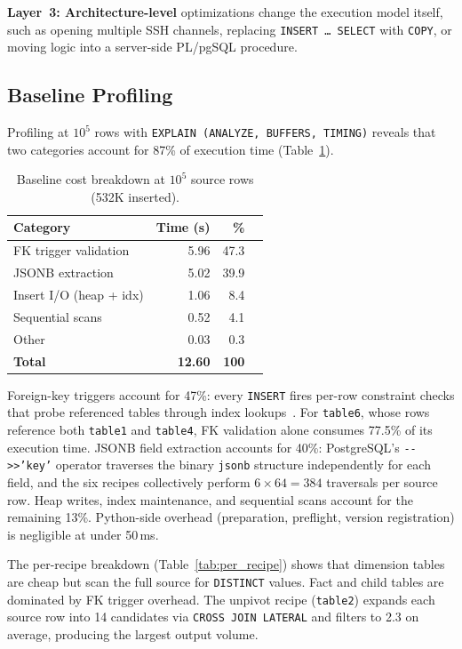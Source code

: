 \documentclass[journal]{IEEEtran}
\begin{document}
\textbf{Layer~3: Architecture-level} optimizations change the execution model itself, such as opening multiple SSH channels, replacing \texttt{INSERT \ldots\ SELECT} with \texttt{COPY}, or moving logic into a server-side PL/pgSQL procedure.

\subsection{Baseline Profiling}
\label{sec:profiling}

Profiling at $10^5$ rows with \texttt{EXPLAIN (ANALYZE, BUFFERS, TIMING)} reveals that two categories account for 87\% of execution time (Table~\ref{tab:baseline_cost}).

\begin{table}[!ht]
\centering
\caption{Baseline cost breakdown at $10^5$ source rows (532K inserted).}
\label{tab:baseline_cost}
\begin{tabular}{lrrr}
\toprule
\textbf{Category} & \textbf{Time (s)} & \textbf{\%} \\
\midrule
FK trigger validation   & 5.96  & 47.3 \\
JSONB extraction        & 5.02  & 39.9 \\
Insert I/O (heap + idx) & 1.06  & 8.4  \\
Sequential scans        & 0.52  & 4.1  \\
Other                   & 0.03  & 0.3  \\
\midrule
\textbf{Total}          & \textbf{12.60} & \textbf{100} \\
\bottomrule
\end{tabular}
\end{table}

Foreign-key triggers account for 47\%: every \texttt{INSERT} fires per-row constraint checks that probe referenced tables through index lookups~\cite{hellerstein2007architecture}.
For \texttt{table6}, whose rows reference both \texttt{table1} and \texttt{table4}, FK validation alone consumes 77.5\% of its execution time.
JSONB field extraction accounts for 40\%: PostgreSQL's \texttt{-{}->{}>'key'} operator traverses the binary \texttt{jsonb} structure independently for each field, and the six recipes collectively perform $6 \times 64 = 384$ traversals per source row.
Heap writes, index maintenance, and sequential scans account for the remaining 13\%.
Python-side overhead (preparation, preflight, version registration) is negligible at under 50\,ms.

The per-recipe breakdown (Table~\ref{tab:per_recipe}) shows that dimension tables are cheap but scan the full source for \texttt{DISTINCT} values.
Fact and child tables are dominated by FK trigger overhead.
The unpivot recipe (\texttt{table2}) expands each source row into 14 candidates via \texttt{CROSS JOIN LATERAL} and filters to 2.3 on average, producing the largest output volume.
\end{document}
